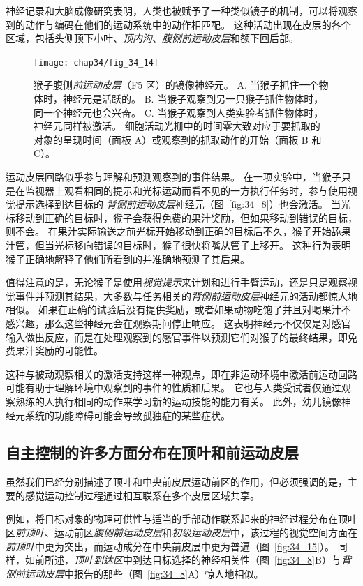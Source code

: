 神经记录和大脑成像研究表明，人类也被赋予了一种类似镜子的机制，可以将观察到的动作与编码在他们的运动系统中的动作相匹配。
这种活动出现在皮层的各个区域，包括头侧顶下小叶、\textit{顶内沟}、\textit{腹侧前运动皮层}和额下回后部。


\begin{figure}[htbp]
	\centering
	\texttt{[image: chap34/fig\_34\_14]}
	\caption{猴子腹侧\textit{前运动皮层}（F5 区）的镜像神经元\cite{rizzolatti1996premotor}。
		A. 当猴子抓住一个物体时，神经元是活跃的。
		B. 当猴子观察到另一只猴子抓住物体时，同一个神经元也会兴奋。
		C. 当猴子观察到人类实验者抓住物体时，神经元同样被激活。
		细胞活动光栅中的时间零大致对应于要抓取的对象的呈现时间（面板 A）或观察到的抓取动作的开始（面板 B 和 C）。}
	\label{fig:34_14}
\end{figure}


运动皮层回路似乎参与理解和预测观察到的事件结果。
在一项实验中，当猴子只是在监视器上观看相同的提示和光标运动而看不见的一方执行任务时，参与使用视觉提示选择到达目标的 \textit{背侧前运动皮层}神经元（图~\ref{fig:34_8}）也会激活。
当光标移动到正确的目标时，猴子会获得免费的果汁奖励，但如果移动到错误的目标，则不会。
在果汁实际输送之前光标开始移动到正确的目标后不久，猴子开始舔果汁管，但当光标移向错误的目标时，猴子很快将嘴从管子上移开。
这种行为表明猴子正确地解释了他们所看到的并准确地预测了其后果。


值得注意的是，无论猴子是使用\textit{视觉提示}来计划和进行手臂运动，还是只是观察视觉事件并预测其结果，大多数与任务相关的\textit{背侧前运动皮层}神经元的活动都惊人地相似。
如果在正确的试验后没有提供奖励，或者如果动物吃饱了并且对喝果汁不感兴趣，那么这些神经元会在观察期间停止响应。
这表明神经元不仅仅是对感官输入做出反应，而是在处理观察到的感官事件以预测它们对猴子的最终结果，即免费果汁奖励的可能性。


这种与被动观察相关的激活支持这样一种观点，即在非运动环境中激活前运动回路可能有助于理解环境中观察到的事件的性质和后果。
它也与人类受试者仅通过观察熟练的人执行相同的动作来学习新的运动技能的能力有关。
此外，幼儿镜像神经元系统的功能障碍可能会导致孤独症的某些症状。



\subsection{自主控制的许多方面分布在顶叶和前运动皮层}

虽然我们已经分别描述了顶叶和中央前皮层运动前区的作用，但必须强调的是，主要的感觉运动控制过程通过相互联系在多个皮层区域共享。


例如，将目标对象的物理可供性与适当的手部动作联系起来的神经过程分布在顶叶区\textit{前顶叶}、运动前区\textit{腹侧前运动皮层}和\textit{初级运动皮层}中，该过程的视觉空间方面在 \textit{前顶叶}中更为突出，而运动成分在中央前皮层中更为普遍（图~\ref{fig:34_15}）。 
同样，如前所述，\textit{顶叶到达区}中到达目标选择的神经相关性（图~\ref{fig:34_8}B）与\textit{背侧前运动皮层}中报告的那些（图~\ref{fig:34_8}A）惊人地相似。


